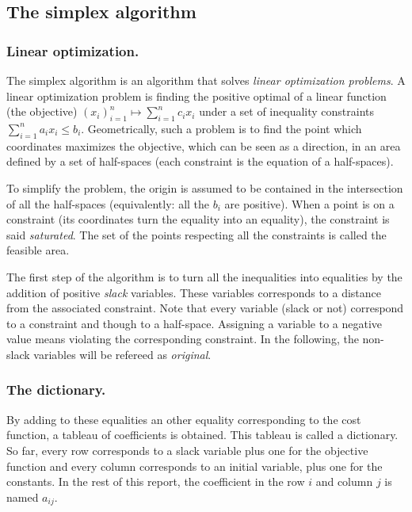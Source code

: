 \subsection{The simplex algorithm}

\subsubsection{Linear optimization.}
The simplex algorithm is an algorithm that solves \emph{linear optimization problems}. A linear optimization problem is finding the positive optimal of a linear function (the objective) $(x_i)_{i=1}^n \mapsto \sum_{i=1}^n c_i x_i$  under a set of inequality constraints $\sum_{i=1}^n a_i x_i \leq b_i$. Geometrically, such a problem is to find the point which coordinates maximizes the objective, which can be seen as a direction, in an area defined by a set of half-spaces (each constraint is the equation of a half-spaces).


To simplify the problem, the origin is assumed to be contained in the intersection of all the half-spaces (equivalently: all the $b_i$ are positive). When a point is on a constraint (its coordinates turn the equality into an equality), the constraint is said \emph{saturated}. The set of the points respecting all the constraints is called the feasible area. 

The first step of the algorithm is to turn all the inequalities into equalities by the addition of positive \emph{slack} variables. These variables corresponds to a distance from the associated constraint. Note that every variable (slack or not) correspond to a constraint and though to a half-space. Assigning a variable to a negative value means violating the corresponding constraint. In the following, the non-slack variables will be refereed as \emph{original}.

\subsubsection{The dictionary.}
By adding to these equalities an other equality corresponding to the cost function, a tableau of coefficients is obtained. This tableau is called a dictionary. So far, every row corresponds to a slack variable plus one for the objective function and every column corresponds to an initial variable, plus one for the constants. In the rest of this report, the coefficient in the row $i$ and column $j$ is named $a_{ij}$.


